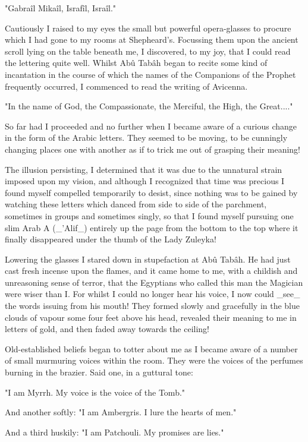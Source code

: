 "Gabraîl Mikaîl, Israfîl, Israîl."

Cautiously I raised to my eyes the small but powerful opera-glasses
to procure which I had gone to my rooms at Shepheard's. Focussing them
upon the ancient scroll lying on the table beneath me, I discovered,
to my joy, that I could read the lettering quite well. Whilst Abû
Tabâh began to recite some kind of incantation in the course of which
the names of the Companions of the Prophet frequently occurred, I
commenced to read the writing of Avicenna.

"In the name of God, the Compassionate, the Merciful, the High, the
Great...."

So far had I proceeded and no further when I became aware of a curious
change in the form of the Arabic letters. They seemed to be moving, to
be cunningly changing places one with another as if to trick me out of
grasping their meaning!

The illusion persisting, I determined that it was due to the unnatural
strain imposed upon my vision, and although I recognized that time
was precious I found myself compelled temporarily to desist, since
nothing was to be gained by watching these letters which danced from
side to side of the parchment, sometimes in groups and sometimes
singly, so that I found myself pursuing one slim Arab A (_'Alif_)
entirely up the page from the bottom to the top where it finally
disappeared under the thumb of the Lady Zuleyka!

Lowering the glasses I stared down in stupefaction at Abû Tabâh. He
had just cast fresh incense upon the flames, and it came home to me,
with a childish and unreasoning sense of terror, that the Egyptians
who called this man the Magician were wiser than I. For whilst I could
no longer hear his voice, I now could _see_ the words issuing from his
mouth! They formed slowly and gracefully in the blue clouds of vapour
some four feet above his head, revealed their meaning to me in letters
of gold, and then faded away towards the ceiling!

Old-established beliefs began to totter about me as I became aware of
a number of small murmuring voices within the room. They were the
voices of the perfumes burning in the brazier. Said one, in a guttural
tone:

"I am Myrrh. My voice is the voice of the Tomb."

And another softly: "I am Ambergris. I lure the hearts of men."

And a third huskily: "I am Patchouli. My promises are lies."

